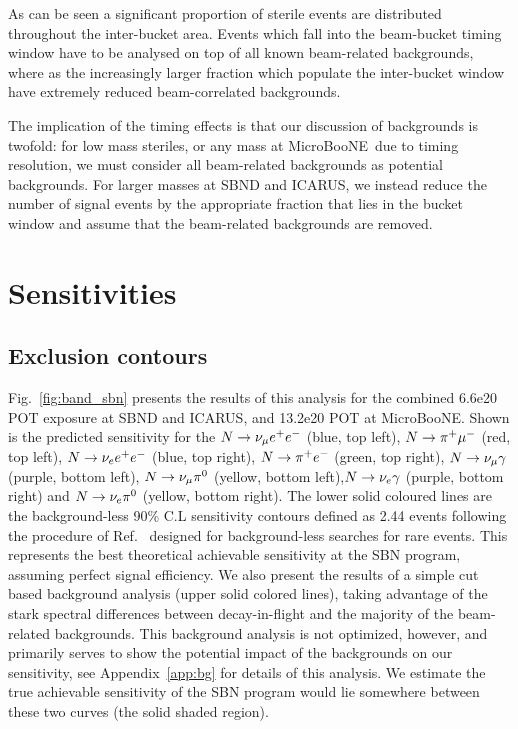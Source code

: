 \documentclass[11pt, a4paper]{article}
\newcommand{\reffig}[1]{Fig.~\ref{#1}}
\newcommand{\refapp}[1]{Appendix~\ref{#1}}
\newcommand{\refref}[1]{Ref.~\cite{#1}}
\def\muboone{MicroBooNE}
\def\ster{\ensuremath N}
\begin{document}
As can be seen a significant proportion of sterile events are distributed throughout the inter-bucket area. Events which fall into the beam-bucket timing window have to be analysed on top of all known beam-related backgrounds, where as the increasingly larger fraction which populate the inter-bucket window have extremely reduced beam-correlated backgrounds.  

The implication of the timing effects is that our discussion of backgrounds is
twofold: for low mass steriles, or any mass at \muboone\ due to timing
resolution, we must consider all beam-related backgrounds as potential
backgrounds. For larger masses at SBND and ICARUS, we instead reduce the number of signal events by the appropriate fraction that lies in the bucket window and assume that the beam-related backgrounds are removed. 

\section{\label{sec:sensitivities}Sensitivities}

\subsection{Exclusion contours}
%
\reffig{fig:band_sbn} presents the results of this analysis for the combined 6.6e20 POT exposure at SBND and ICARUS, and 13.2e20 POT at \muboone. Shown is the predicted sensitivity for the $\ster \rightarrow \nu_\mu e^+e^-$ (blue, top left), $\ster \rightarrow \pi^+ \mu^-$ (red, top left), $\ster \rightarrow \nu_e e^+ e^-$ (blue, top right),  $\ster \rightarrow \pi^+ e^-$ (green, top right), $\ster \rightarrow \nu_\mu \gamma$ (purple, bottom left), $\ster \rightarrow \nu_\mu \pi^0$ (yellow, bottom left),$\ster \rightarrow \nu_e \gamma$ (purple, bottom right) and $\ster \rightarrow \nu_e \pi^0$ (yellow, bottom right). The lower solid coloured lines are the background-less 90\% C.L sensitivity contours defined as 2.44 events following the procedure of \refref{Feldman:1997qc} designed for
background-less searches for rare events. This represents the best theoretical achievable sensitivity at the SBN program, assuming perfect signal efficiency. We also present the results of a simple cut based background analysis (upper solid colored lines), taking advantage of the stark spectral differences between decay-in-flight and the majority of the beam-related backgrounds. This background analysis is not optimized, however, and primarily serves to show the potential impact of the backgrounds on our sensitivity,  see \refapp{app:bg} for details of this analysis. We estimate the true achievable sensitivity of the SBN program would lie somewhere
between these two curves (the solid shaded region). 
\end{document}
